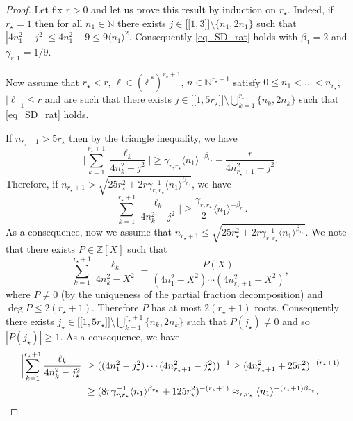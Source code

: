 \documentclass[11pt]{article}
\newcommand{\llbracket}{\mathopen{[\!\![}}
\newcommand{\rrbracket}{\mathclose{]\!\!]}}
\theoremstyle{definition}
\begin{document}
\begin{proof} Let fix $r>0$ and let us prove this result by induction on $r_\star$. Indeed, if~$r_\star = 1$ then for all $n_1\in \mathbb{N}$ there exists $j\in \llbracket 1,3 \rrbracket \setminus \{n_1,2n_1\}$ such that $|4n_1^2-j^2 |\leq 4 n_1^2 + 9 \leq 9 \langle n_1 \rangle^2$. Consequently \eqref{eq_SD_rat} holds with $\beta_1=2$ and $\gamma_{r,1} = 1/9$.

Now assume that $r_\star < r$, $\ell \in (\mathbb{Z}^*)^{r_\star+1}$, $n \in \mathbb{N}^{r_\star+1}$ satisfy $0\leq n_1 < \dots < n_{r_\star}$, $|\ell|_1\leq r$ and are such that there exists $j\in \llbracket 1,5r_\star \rrbracket \setminus \bigcup_{k=1}^{r_\star}\{ n_k,2n_k\}$ such that \eqref{eq_SD_rat} holds.

If $n_{r_\star+1}> 5 r_\star$ then by the triangle inequality, we have
\[
\biggl| \sum_{k=1}^{r_\star+1} \frac{\ell_k}{4n_k^2-j^2} \biggr| \geq \gamma_{r,r_\star} \langle n_1 \rangle^{-\beta_{r_\star}} - \frac{r}{4n_{r_\star+1}^2-j^2}.
\]
Therefore, if $n_{r_\star+1} > \sqrt{25r_\star^2 +2r \gamma_{r,r_\star}^{-1} \langle n_1 \rangle^{\beta_{r_\star}} }$, we have
\[
\biggl| \sum_{k=1}^{r_\star+1} \frac{\ell_k}{4n_k^2-j^2} \biggr| \geq \frac{\gamma_{r,r_\star}}2 \langle n_1 \rangle^{-\beta_{r_\star}}.
\]
As a consequence, now we assume that $n_{r_\star+1} \leq \sqrt{25r_\star^2 +2r \gamma_{r,r_\star}^{-1} \langle n_1 \rangle^{\beta_{r_\star}} }$. We note that there exists $P\in \mathbb{Z}[X]$ such that
\[
\sum_{k=1}^{r_\star+1} \frac{\ell_k}{4n_k^2-X^2} = \frac{P(X)}{(4n_1^2-X^2) \cdots (4n_{r_\star+1}^2-X^2) },
\]
where $P\neq 0$ (by the uniqueness of the partial fraction decomposition) and $\deg P \leq 2 (r_\star +1)$. Therefore $P$ has at most $2 (r_\star +1)$ roots. Consequently there exists $j_\star\in \llbracket 1,5r_\star \rrbracket \setminus \bigcup_{k=1}^{r_\star+1}\{ n_k,2n_k\}$ such that $P(j_\star) \neq 0$ and so $|P(j_\star)|\geq 1$. As a consequence, we have
\begin{align*}
\biggl| \sum_{k=1}^{r_\star+1} \frac{\ell_k}{4n_k^2-j_\star^2} \biggr| &\geq ((4n_1^2-j_\star^2) \cdots (4n_{r_\star+1}^2-j_\star^2))^{-1} \geq (4n_{r_\star+1}^2+25r_\star^2)^{-(r_\star+1)} \\
&\geq (8r \gamma_{r,r_\star}^{-1} \langle n_1 \rangle^{\beta_{r_\star}}+125r_\star^2)^{-(r_\star+1)} \approx_{r,r_\star} \langle n_1 \rangle^{ -(r_\star+1) \beta_{r_\star}}.\qedhere
\end{align*}
\end{proof}
\end{document}
